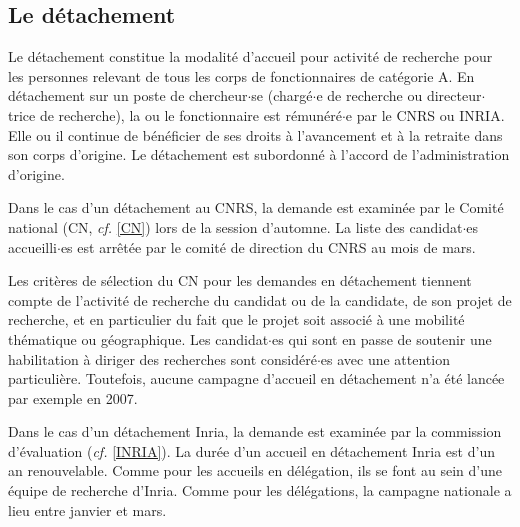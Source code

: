 
\subsection{Le d\'etachement}
\label{detachement}


Le d\'etachement constitue la modalit\'e d'accueil pour activit\'e
de recherche pour les personnes relevant de tous les corps de
fonctionnaires de cat\'egorie A. En d\'etachement sur un poste de
chercheur$\cdot$se (charg\'e$\cdot$e de recherche ou directeur$\cdot$trice de recherche), la ou le
fonctionnaire est r\'emun\'er\'e$\cdot$e par le CNRS ou INRIA. Elle ou il continue
de b\'en\'eficier de ses droits \`a l'avancement et \`a la retraite
dans son corps d'origine. Le d\'etachement est subordonn\'e \`a
l'accord de l'administration d'origine.

Dans le cas d'un d\'etachement au CNRS, la demande est examin\'ee
par le Comit\'e national (CN, {\em cf.} \ref{CN}) lors de la session
d'automne. La liste des candidat$\cdot$es accueilli$\cdot$es est arr\^et\'ee par le
comit\'e de direction du CNRS au mois de mars.

Les crit\`eres de s\'election du CN pour les demandes en
d\'etachement tiennent compte de l'activit\'e de recherche du
candidat ou de la candidate, de son projet de recherche, et en particulier du fait que
le projet soit associ\'e \`a une mobilit\'e th\'ematique ou
g\'eographique. Les candidat$\cdot$es qui sont en passe de soutenir une
habilitation \`a diriger des recherches sont consid\'er\'e$\cdot$es avec une
attention particuli\`ere. Toutefois, aucune campagne d'accueil en
d\'etachement n'a \'et\'e lanc\'ee par exemple en 2007.

Dans le cas d'un d\'etachement Inria, la demande est
examin\'ee par la commission d'\'evaluation ({\em cf.} \ref{INRIA}).
La dur\'ee d'un accueil en d\'etachement Inria est d'un an
renouvelable. Comme pour les accueils en d\'el\'egation, ils se font
au sein d'une \'equipe de recherche d'Inria. Comme pour les d\'el\'egations,
la campagne nationale a lieu entre janvier et mars.

